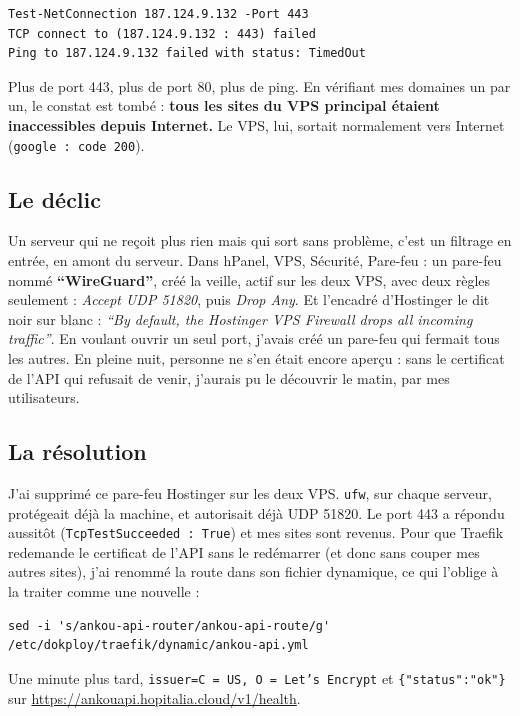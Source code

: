 \documentclass[10pt,twoside,openany]{article}
\begin{document}
\begin{lstlisting}
Test-NetConnection 187.124.9.132 -Port 443
TCP connect to (187.124.9.132 : 443) failed
Ping to 187.124.9.132 failed with status: TimedOut
\end{lstlisting}

Plus de port 443, plus de port 80, plus de ping. En vérifiant mes domaines un par un, le constat est tombé : \textbf{tous les sites du VPS principal étaient inaccessibles depuis Internet.} Le VPS, lui, sortait normalement vers Internet (\texttt{google : code 200}).

\subsection*{Le déclic}
Un serveur qui ne reçoit plus rien mais qui sort sans problème, c'est un filtrage en entrée, en amont du serveur. Dans hPanel, VPS, Sécurité, Pare-feu : un pare-feu nommé \textbf{\enquote{WireGuard}}, créé la veille, actif sur les deux VPS, avec deux règles seulement : \textit{Accept UDP 51820}, puis \textit{Drop Any}. Et l'encadré d'Hostinger le dit noir sur blanc : \textit{\enquote{By default, the Hostinger VPS Firewall drops all incoming traffic}}. En voulant ouvrir un seul port, j'avais créé un pare-feu qui fermait tous les autres. En pleine nuit, personne ne s'en était encore aperçu : sans le certificat de l'API qui refusait de venir, j'aurais pu le découvrir le matin, par mes utilisateurs.

\subsection*{La résolution}
J'ai supprimé ce pare-feu Hostinger sur les deux VPS. \texttt{ufw}, sur chaque serveur, protégeait déjà la machine, et autorisait déjà UDP 51820. Le port 443 a répondu aussitôt (\texttt{TcpTestSucceeded : True}) et mes sites sont revenus. Pour que Traefik redemande le certificat de l'API sans le redémarrer (et donc sans couper mes autres sites), j'ai renommé la route dans son fichier dynamique, ce qui l'oblige à la traiter comme une nouvelle :

\begin{lstlisting}
sed -i 's/ankou-api-router/ankou-api-route/g' /etc/dokploy/traefik/dynamic/ankou-api.yml
\end{lstlisting}

Une minute plus tard, \texttt{issuer=C = US, O = Let's Encrypt} et \texttt{\{"status":"ok"\}} sur \url{https://ankouapi.hopitalia.cloud/v1/health}.
\end{document}
